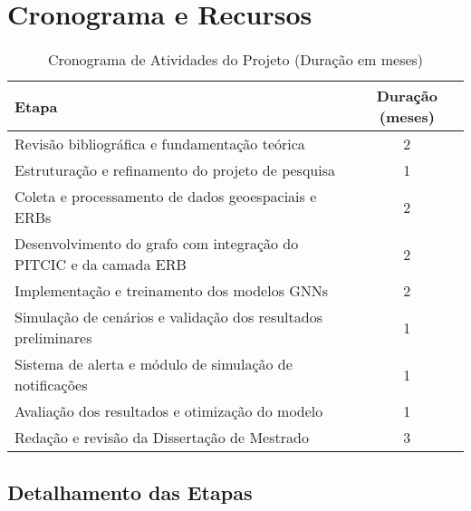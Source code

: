 \chapter{Cronograma e Recursos}
\label{chap:cronograma}

\begin{table}[H]
    \centering
    \caption{Cronograma de Atividades do Projeto (Duração em meses)}
    \begin{tabular}{lc}
        \toprule
        \textbf{Etapa} & \textbf{Duração (meses)} \\
        \midrule
        Revisão bibliográfica e fundamentação teórica & 2 \\
        Estruturação e refinamento do projeto de pesquisa & 1 \\
        Coleta e processamento de dados geoespaciais e \gls{ERB}s & 2 \\
        Desenvolvimento do grafo com integração do \gls{PITCIC} e da camada \gls{ERB} & 2 \\
        Implementação e treinamento dos modelos \gls{GNN}s & 2 \\
        Simulação de cenários e validação dos resultados preliminares & 1 \\
        Sistema de alerta e módulo de simulação de notificações & 1 \\
        Avaliação dos resultados e otimização do modelo & 1 \\
        Redação e revisão da Dissertação de Mestrado & 3 \\
        \bottomrule
    \end{tabular}
\end{table}

\section{Detalhamento das Etapas}

